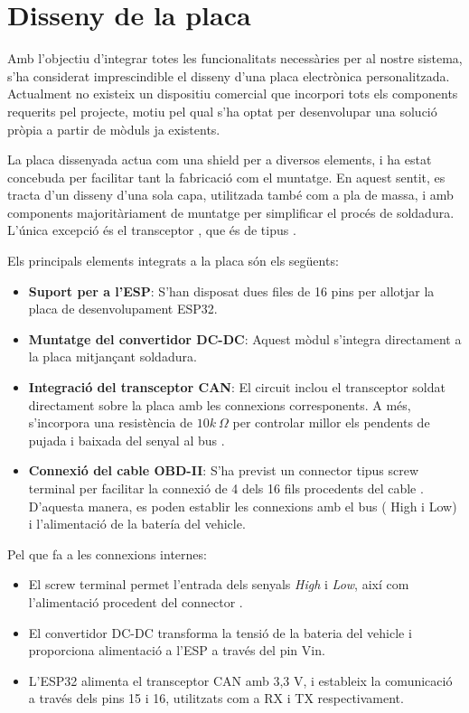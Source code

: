 \documentclass{tfgitic}[2024/07/01]
\begin{document}
\section{Disseny de la placa}

Amb l'objectiu d'integrar totes les funcionalitats necessàries per al nostre sistema, s'ha considerat imprescindible el disseny d'una placa electrònica personalitzada. Actualment no existeix 
un dispositiu comercial que incorpori tots els components requerits pel projecte, motiu pel qual s'ha optat per desenvolupar una solució pròpia a partir de mòduls ja existents.

La placa dissenyada actua com una shield per a diversos elements, i ha estat concebuda per facilitar tant la fabricació com el muntatge. En aquest sentit, es tracta d'un disseny d'una sola capa, 
utilitzada també com a pla de massa, i amb components majoritàriament de muntatge  per simplificar el procés de soldadura. L'única excepció és el transceptor , que és de tipus .

Els principals elements integrats a la placa són els següents:

\begin{itemize}
  \item \textbf{Suport per a l'ESP}: S'han disposat dues files de 16 pins per allotjar la placa de desenvolupament ESP32.
  
  \item \textbf{Muntatge del convertidor DC-DC}: Aquest mòdul s'integra directament a la placa mitjançant soldadura.
  
  \item \textbf{Integració del transceptor CAN}: El circuit inclou el transceptor soldat directament sobre la placa amb les connexions corresponents. A més, s'incorpora una resistència de 
  $10k\ \Omega$ per controlar millor els pendents de pujada i baixada del senyal al bus .
  
  \item \textbf{Connexió del cable OBD-II}: S'ha previst un connector tipus screw terminal per facilitar la connexió de 4 dels 16 fils procedents del cable . D'aquesta manera, es poden 
  establir les connexions amb el bus  ( High i  Low) i l'alimentació de la batería del vehicle.
\end{itemize} 

Pel que fa a les connexions internes:

\begin{itemize}
  \item El screw terminal permet l'entrada dels senyals  \textit{High} i  \textit{Low}, així com l'alimentació procedent del connector .
  
  \item El convertidor DC-DC transforma la tensió de la bateria del vehicle i proporciona alimentació a l'ESP a través del pin Vin.
  
  \item L'ESP32 alimenta el transceptor CAN amb 3,3 V, i estableix la comunicació a través dels pins  15 i 16, utilitzats com a RX i TX respectivament.
\end{itemize} 
\end{document}
